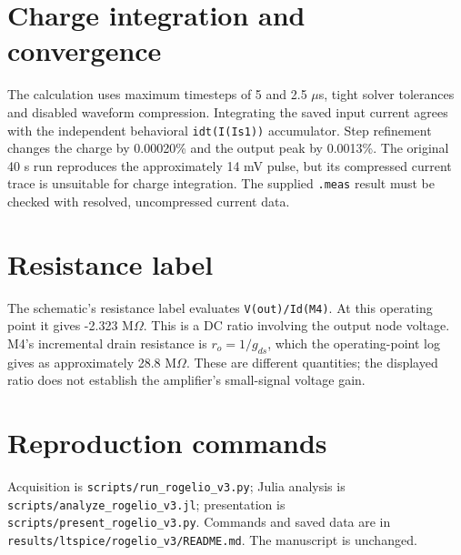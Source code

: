\documentclass[11pt,a4paper]{article}
\begin{document}
\section*{Charge integration and convergence}
The calculation uses maximum timesteps of 5 and 2.5 $\mu$s, tight solver
tolerances and disabled waveform compression. Integrating the saved input
current agrees with the independent behavioral \texttt{idt(I(Is1))}
accumulator. Step refinement changes the charge by 0.00020\% and the
output peak by 0.0013\%.
The original 40 s run reproduces the approximately 14 mV pulse, but its
compressed current trace is unsuitable for charge integration. The supplied
\texttt{.meas} result must be checked with resolved, uncompressed current data.

\section*{Resistance label}
The schematic's resistance label evaluates \texttt{V(out)/Id(M4)}. At this
operating point it gives -2.323 M$\Omega$. This is a DC ratio involving
the output node voltage. M4's incremental drain resistance is
$r_o=1/g_{ds}$, which the operating-point log gives as approximately
28.8 M$\Omega$. These are different quantities; the displayed ratio does
not establish the amplifier's small-signal voltage gain.

\section*{Reproduction commands}
Acquisition is \texttt{scripts/run\_rogelio\_v3.py}; Julia analysis is
\texttt{scripts/analyze\_rogelio\_v3.jl}; presentation is
\texttt{scripts/present\_rogelio\_v3.py}. Commands and saved data are in
\texttt{results/ltspice/rogelio\_v3/README.md}. The manuscript is unchanged.
\end{document}
